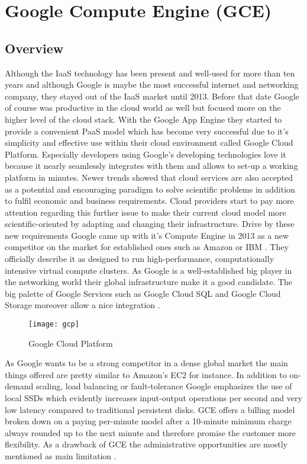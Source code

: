 \section{Google Compute Engine (GCE)}

\subsection{Overview}
Although the IaaS technology has been present and well-used for more than ten years and although Google is maybe the most successful internet and networking company, they stayed out of the IaaS market until 2013. Before that date Google of course was productive in the cloud world as well but focused more on the higher level of the cloud stack. With the Google App Engine they started to provide a convenient PaaS model which has become very successful due to it's simplicity and effective use within their cloud environment called Google Cloud Platform. Especially developers using Google's developing technologies love it because it nearly seamlessly integrates with them and allows to set-up a working platform in minutes. Newer trends showed that cloud services are also accepted as a potential and encouraging paradigm to solve scientific problems in addition to fulfil economic and business requirements. Cloud providers start to pay more attention regarding this further issue to make their current cloud model more scientific-oriented by adapting and changing their infrastructure. Drive by these new requirements Google came up with it's Compute Engine in 2013 as a new competitor on the market for established ones such as Amazon or IBM \cite{GCE_2013}. They officially describe it as designed to run high-performance, computationally intensive virtual compute clusters. As Google is a well-established big player in the networking world their global infrastructure make it a good candidate. The big palette of Google Services such as Google Cloud SQL and Google Cloud Storage moreover allow a nice integration \cite{IaaS_2015}.

\begin{figure}[h!]
	\centering
		\texttt{[image: gcp]}
	\caption{Google Cloud Platform}
\end{figure}

As Google wants to be a strong competitor in a dense global market the main things offered are pretty similar to Amazon's EC2 for instance. In addition to on-demand scaling, load balancing or fault-tolerance Google emphasizes the use of local SSDs which evidently increases input-output operations per second and very low latency compared to traditional persistent disks. GCE offers a billing model broken down on a paying per-minute model after a 10-minute minimum charge always rounded up to the next minute and therefore promise the customer more flexibility. As a drawback of GCE the administrative opportunities are mostly mentioned as main limitation \cite{GoogleDev}.

